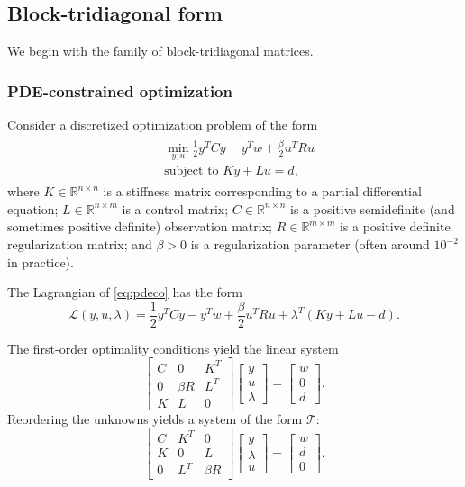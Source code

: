 \documentclass{article}
\newcommand{\sT}{\mathcal{T}}
\begin{document}
\subsection{Block-tridiagonal form}
We begin with the family of block-tridiagonal matrices. %
\subsubsection{PDE-constrained optimization}
\label{sec:PDEC}

Consider a discretized optimization problem of the form
\begin{align}
\begin{split}
&\min_{y,u} \frac{1}{2} y^T C y -y^T w + \frac{\beta}{2} u^T R u \\
& \textrm{subject to } Ky + Lu = d,
\end{split}
\label{eq:pdeco}
\end{align}
where $K \in \mathbb{R}^{n \times n}$ is a stiffness matrix corresponding to a partial differential equation; $L \in \mathbb{R}^{n \times m}$ is a control matrix; $C \in \mathbb{R}^{n \times n}$ is a positive semidefinite (and sometimes positive definite) observation matrix; $R \in \mathbb{R}^{m \times m}$ is a positive definite regularization matrix; and $\beta > 0$ is a regularization parameter (often around $10^{-2}$ in practice). 

The Lagrangian of \eqref{eq:pdeco} has the form
\[
\mathcal{L}(y,u,\lambda) = \frac12 y^T C y - y^T w + \frac{\beta}{2} u^T R u + \lambda^T(Ky+Lu-d).
\]

The first-order optimality conditions yield the linear system
\[
\begin{bmatrix}
C & 0 & K^T \\
0 & \beta R & L^T \\
K & L & 0
\end{bmatrix}
\begin{bmatrix}
y \\
u \\
\lambda
\end{bmatrix}
= \begin{bmatrix}
w \\
0 \\
d
\end{bmatrix}.
\]
Reordering the unknowns yields a system of the form $\sT$:
\begin{equation}
\label{eq:pdeco_gen_2sp}
\begin{bmatrix}
C & K^T & 0 \\
K & 0 & L \\
0 & L^T & \beta R
\end{bmatrix}
\begin{bmatrix}
y \\
\lambda \\
u
\end{bmatrix} = \begin{bmatrix}
w \\
d \\
0
\end{bmatrix}.
\end{equation}
\end{document}
